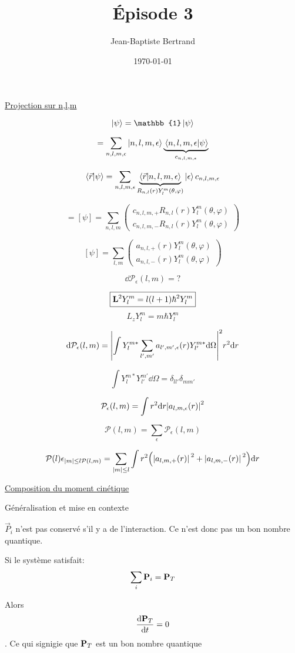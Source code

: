 \documentclass{article}
\title{Épisode 3}
\author{Jean-Baptiste Bertrand}
\date{\today}
\begin{document}
\maketitle

\underline{Projection sur n,l,m}

$$\ket\psi =\mathbb{1}\ket\psi$$

$$ =\sum_{n,l,m,\epsilon} \ket{n,l,m,\epsilon}\underbrace{\braket*{n,l,m,\epsilon}{\psi}}_{c_{n,l,m,\epsilon}}$$

$$\braket{\vec r}{\psi} = \sum_{n,l,m,\epsilon} \underbrace{\bra{\vec r}\ket{n,l,m,\epsilon}}_{R_{n,l}(r)Y_l^m(\theta,\varphi)}\ket{\epsilon}c_{n,l,m,\epsilon}$$

$$= [\psi] = \sum_{n,l,m} \begin{pmatrix}c_{n,l,m,+}R_{n,l}(r)Y_l^m(\theta,\varphi)\\c_{n,l,m,-}R_{n,l}(r)Y_l^m(\theta,\varphi)\end{pmatrix}$$

$$[\psi] = \sum_{l,m} \begin{pmatrix}a_{n,l,+}(r)Y_l^m(\theta,\varphi)\\a_{n,l,-}(r)Y_l^m(\theta,\varphi)\end{pmatrix}$$

$$\dd \mathcal{P}_\epsilon(l,m) = ? $$

$$\boxed{\vb L^2Y_l^m=l(l+1)\hbar^2Y_l^m}$$
$$\boxed{L_zY_l^m=m\hbar Y_l^m}$$


$$\dd \mathcal{P}_\epsilon(l,m) = \abs{\int Y_l^{m*}\sum_{l',m'}a_{l',m',\epsilon}(r)Y^{m*}_{l'}\dd \Omega}^2 r^2 \dd r$$


$$\boxed{\int Y_l^{m*}Y_{l'}^{m'} \dd \Omega = \delta_{ll'}\delta_{mm'}}$$

$$\mathcal{P}_\epsilon(l,m) = \int r^2 \dd r \abs{a_{l,m,\epsilon}(r)}^2$$

$$\mathcal{P}(l,m) = \sum_\epsilon \mathcal{P}_\epsilon(l,m)$$

$$\mathcal{P}(l)\epsilon_{\abs*{m}\leq l \mathcal{P}(l,m)} = \sum_{\abs{m}\leq l}\int r^2\qty(\abs*{a_{l,m,+}(r)}^2 + \abs*{a_{l,m,-}(r)}^2)\dd r$$


\underline{Composition du moment cinétique}

Généralisation et mise en contexte

$\vec P_i$ n'est pas conservé s'il y a de l'interaction. Ce n'est donc pas un bon nombre quantique.

Si le système satisfait: $$\sum_i \vb P_i = \vb P_T$$

Alors $$\dv{\vb P_T}{t}= 0$$. Ce qui signigie que $\vb P_T$ est un bon nombre quantique
\end{document}
